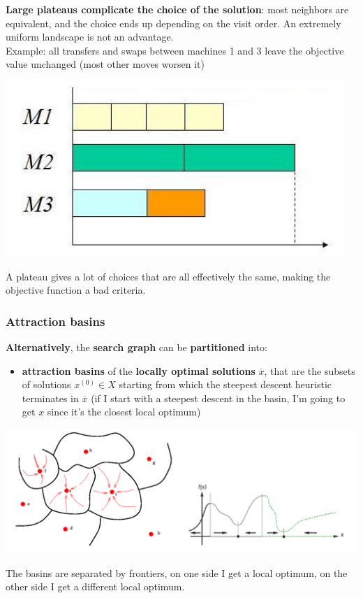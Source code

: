 \documentclass[11pt]{article}
\begin{document}
	\textbf{Large plateaus complicate the choice of the solution}: most neighbors are equivalent, and the choice ends up depending on the visit order. An extremely uniform landscape is not an advantage.\\
	
	Example: all transfers and swaps between machines 1 and 3 leave the objective value unchanged (most other moves worsen it)
	\begin{center}
		\includegraphics[width=0.55\columnwidth]{img/plateau2}
	\end{center}
	
	A plateau gives a lot of choices that are all effectively the same, making the objective function a bad criteria.\\
	
	\newpage
	
	\subsubsection{Attraction basins}
	\textbf{Alternatively}, the \textbf{search graph} can be \textbf{partitioned} into:
	\begin{itemize}
		\item \textbf{attraction basins} of the \textbf{locally optimal solutions} $\overline{x}$, that are the subsets of solutions $x^{(0)} \in X$ starting from which the steepest descent heuristic terminates in $\overline{x}$ (if I start with a steepest descent in the basin, I'm going to get $x$ since it's the closest local optimum)
	\end{itemize}
	\begin{center}
		\includegraphics[width=\columnwidth]{img/basins}
	\end{center}
	The basins are separated by frontiers, on one side I get a local optimum, on the other side I get a different local optimum.\\ 
	
\end{document}
